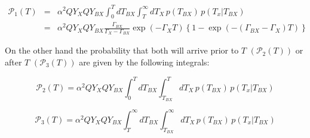 \documentclass[reprint,onecolumn]{revtex4-1}
\begin{document}
\begin{eqnarray*}
\mathscr{\mathcal{\mathscr{P}}}_{1}(T) & = & \alpha^{2}QY_{X}QY_{BX}\int_{0}^{T}dT_{BX}\int_{T}^{\infty}dT_{X}\,p(T_{BX})\,p\left(T_{x}\right|\left.T_{BX}\right)\nonumber \\
 & = & \alpha^{2}QY_{X}QY_{BX}\frac{\Gamma_{BX}}{\Gamma_{X}-\Gamma_{BX}}\exp\left(-\Gamma_{X}T\right)\left\{ 1-\exp\left(-\left(\Gamma_{BX}-\Gamma_{X}\right)T\right)\right\} 
\end{eqnarray*}

On the other hand the probability that both will arrive prior to $T$
$\left(\mathscr{\mathcal{\mathscr{P}}}_{2}(T)\right)$ or after $T$
$\left(\mathscr{\mathcal{\mathscr{P}}}_{3}(T)\right)$ are given by
the following integrals:

\[
\mathscr{\mathcal{\mathscr{P}}}_{2}(T)=\alpha^{2}QY_{X}QY_{BX}\int_{0}^{T}dT_{BX}\int_{T_{BX}}^{T}dT_{X}\,p(T_{BX})\,p\left(T_{x}\right|\left.T_{BX}\right)
\]

\[
\mathscr{\mathcal{\mathscr{P}}}_{3}(T)=\alpha^{2}QY_{X}QY_{BX}\int_{T}^{\infty}dT_{BX}\int_{T_{BX}}^{\infty}dT_{X}\,p(T_{BX})\,p\left(T_{x}\right|\left.T_{BX}\right)
\]
\end{document}
